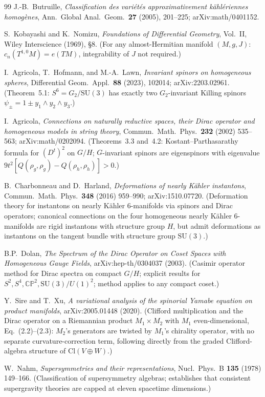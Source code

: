 \documentclass[12pt,a4paper]{article}
\begin{document}
\begin{thebibliography}{99}
J.-B.~Butruille,
\textit{Classification des vari\'et\'es approximativement k\"ahl\'eriennes homog\`enes},
Ann.\ Global Anal.\ Geom.\ \textbf{27} (2005), 201--225;
arXiv:math/0401152.

S.~Kobayashi and K.~Nomizu,
\textit{Foundations of Differential Geometry}, Vol.~II,
Wiley Interscience (1969), \S 8.
(For any almost-Hermitian manifold $(M,g,J)$: $c_n(T^{1,0}M)=e(TM)$,
integrability of $J$ not required.)

I.~Agricola, T.~Hofmann, and M.-A.~Lawn,
\textit{Invariant spinors on homogeneous spheres},
Differential Geom.\ Appl.\ \textbf{88} (2023), 102014;
arXiv:2203.02961.
(Theorem~5.1: $S^6=G_2/\mathrm{SU}(3)$ has exactly two $G_2$-invariant Killing spinors
$\psi_\pm = 1\pm y_1\wedge y_2\wedge y_3$.)

I.~Agricola,
\textit{Connections on naturally reductive spaces, their Dirac operator and homogeneous
models in string theory},
Commun.\ Math.\ Phys.\ \textbf{232} (2002) 535--563;
arXiv:math/0202094.
(Theorems~3.3 and~4.2: Kostant--Parthasarathy formula for $(D^t)^2$ on $G/H$;
$G$-invariant spinors are eigenspinors with eigenvalue $9t^2[Q(\rho_g,\rho_g)-Q(\rho_h,\rho_h)]>0$.)

B.~Charbonneau and D.~Harland,
\textit{Deformations of nearly K\"ahler instantons},
Commun.\ Math.\ Phys.\ \textbf{348} (2016) 959--990;
arXiv:1510.07720.
(Deformation theory for instantons on nearly K\"ahler 6-manifolds via spinors and Dirac
operators; canonical connections on the four homogeneous nearly K\"ahler 6-manifolds are
rigid instantons with structure group $H$, but admit deformations as instantons on the
tangent bundle with structure group $\mathrm{SU}(3)$.)

B.P.~Dolan,
\textit{The Spectrum of the Dirac Operator on Coset Spaces with Homogeneous Gauge Fields},
arXiv:hep-th/0304037 (2003).
(Casimir operator method for Dirac spectra on compact $G/H$; explicit results for
$S^2, S^4, \mathbb{CP}^2, \mathrm{SU}(3)/U(1)^2$; method applies to any compact coset.)

Y.~Sire and T.~Xu,
\textit{A variational analysis of the spinorial Yamabe equation on product manifolds},
arXiv:2005.01448 (2020).
(Clifford multiplication and the Dirac operator on a Riemannian product $M_1\times M_2$
with $M_1$ even-dimensional, Eq.~(2.2)--(2.3): $M_2$'s generators are twisted by
$M_1$'s chirality operator, with no separate curvature-correction term, following
directly from the graded Clifford-algebra structure of $\mathrm{Cl}(V\oplus W)$.)

W.~Nahm,
\textit{Supersymmetries and their representations},
Nucl.\ Phys.\ B \textbf{135} (1978) 149--166.
(Classification of supersymmetry algebras; establishes that consistent supergravity
theories are capped at eleven spacetime dimensions.)

\end{thebibliography}
\end{document}
